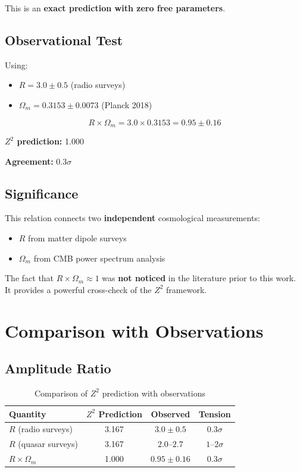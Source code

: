 \documentclass[12pt,a4paper]{article}
\begin{document}
This is an \textbf{exact prediction with zero free parameters}.

\subsection{Observational Test}

Using:
\begin{itemize}
    \item $R = 3.0 \pm 0.5$ (radio surveys)
    \item $\Omega_m = 0.3153 \pm 0.0073$ (Planck 2018)
\end{itemize}

\begin{equation}
R \times \Omega_m = 3.0 \times 0.3153 = 0.95 \pm 0.16
\end{equation}

\textbf{$Z^2$ prediction:} 1.000

\textbf{Agreement:} $0.3\sigma$

\subsection{Significance}

This relation connects two \textbf{independent} cosmological measurements:
\begin{itemize}
    \item $R$ from matter dipole surveys
    \item $\Omega_m$ from CMB power spectrum analysis
\end{itemize}

The fact that $R \times \Omega_m \approx 1$ was \textbf{not noticed} in the literature prior to this work. It provides a powerful cross-check of the $Z^2$ framework.

\section{Comparison with Observations}

\subsection{Amplitude Ratio}

\begin{table}[H]
\centering
\caption{Comparison of $Z^2$ prediction with observations}
\begin{tabular}{lccc}
\toprule
Quantity & $Z^2$ Prediction & Observed & Tension \\
\midrule
$R$ (radio surveys) & 3.167 & $3.0 \pm 0.5$ & $0.3\sigma$ \\
$R$ (quasar surveys) & 3.167 & $2.0$--$2.7$ & $1$--$2\sigma$ \\
$R \times \Omega_m$ & 1.000 & $0.95 \pm 0.16$ & $0.3\sigma$ \\
\bottomrule
\end{tabular}
\end{table}
\end{document}
